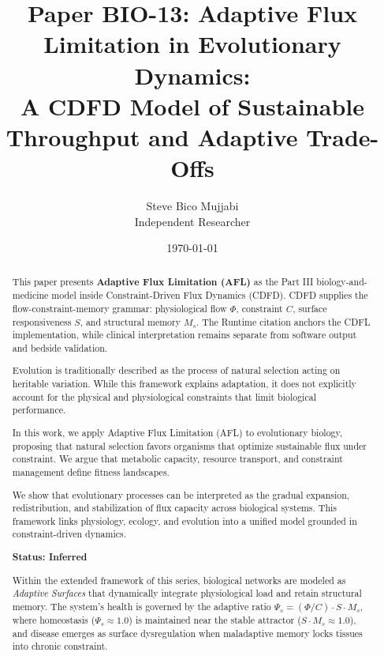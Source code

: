 \documentclass[11pt]{article}
\title{\textbf{Paper BIO-13: Adaptive Flux Limitation in Evolutionary Dynamics:\\ A CDFD Model of Sustainable Throughput and Adaptive Trade-Offs}}
\author{Steve Bico Mujjabi\\ \small Independent Researcher}
\date{\today}
\begin{document}
\maketitle

\begin{abstract}

This paper presents \textbf{Adaptive Flux Limitation (AFL)} as the Part III biology-and-medicine model inside Constraint-Driven Flux Dynamics (CDFD). CDFD supplies the flow-constraint-memory grammar: physiological flow $\Phi$, constraint $C$, surface responsiveness $S$, and structural memory $M_s$. The Runtime citation anchors the CDFL implementation, while clinical interpretation remains separate from software output and bedside validation.


Evolution is traditionally described as the process of natural selection acting on heritable variation. While this framework explains adaptation, it does not explicitly account for the physical and physiological constraints that limit biological performance.

In this work, we apply Adaptive Flux Limitation (AFL) to evolutionary biology, proposing that natural selection favors organisms that optimize sustainable flux under constraint. We argue that metabolic capacity, resource transport, and constraint management define fitness landscapes.

We show that evolutionary processes can be interpreted as the gradual expansion, redistribution, and stabilization of flux capacity across biological systems. This framework links physiology, ecology, and evolution into a unified model grounded in constraint-driven dynamics.

\textbf{Status: Inferred}

\medskip
\noindent Within the extended framework of this series, biological networks are modeled as \emph{Adaptive Surfaces} that dynamically integrate physiological load and retain structural memory. The system's health is governed by the adaptive ratio $\Psi_s = (\Phi/C) \cdot S \cdot M_s$, where homeostasis ($\Psi_s \approx 1.0$) is maintained near the stable attractor ($S \cdot M_s \approx 1.0$), and disease emerges as surface dysregulation when maladaptive memory locks tissues into chronic constraint.

\end{abstract}
\end{document}
